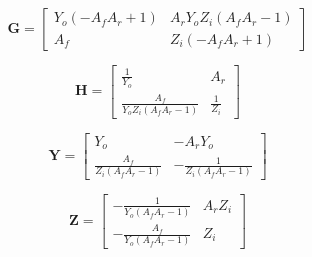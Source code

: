 \documentclass[a4paper, 12pt]{article}
\newcommand{\mat}[1]{\mathbf{#1}}
\begin{document}
\begin{equation}
\mat{G} = \left[\begin{matrix}Y_{o} \left(- A_{f} A_{r} + 1\right) & A_{r} Y_{o} Z_{i} \left(A_{f} A_{r} - 1\right)\\A_{f} & Z_{i} \left(- A_{f} A_{r} + 1\right)\end{matrix}\right]
\end{equation}

\begin{equation}
\mat{H} = \left[\begin{matrix}\frac{1}{Y_{o}} & A_{r}\\\frac{A_{f}}{Y_{o} Z_{i} \left(A_{f} A_{r} - 1\right)} & \frac{1}{Z_{i}}\end{matrix}\right]
\end{equation}

\begin{equation}
\mat{Y} = \left[\begin{matrix}Y_{o} & - A_{r} Y_{o}\\\frac{A_{f}}{Z_{i} \left(A_{f} A_{r} - 1\right)} & - \frac{1}{Z_{i} \left(A_{f} A_{r} - 1\right)}\end{matrix}\right]
\end{equation}

\begin{equation}
\mat{Z} = \left[\begin{matrix}- \frac{1}{Y_{o} \left(A_{f} A_{r} - 1\right)} & A_{r} Z_{i}\\- \frac{A_{f}}{Y_{o} \left(A_{f} A_{r} - 1\right)} & Z_{i}\end{matrix}\right]
\end{equation}
\end{document}
